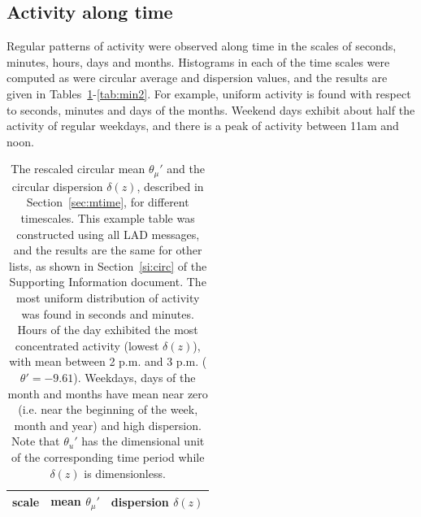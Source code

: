 \documentclass[%
aip,
jmp,%
amsmath,amssymb,
reprint,%
]{revtex4-1}
\begin{document}
\subsection{Activity along time}\label{constDisc}
Regular patterns of activity were observed along time
in the scales of seconds, minutes, hours, days and months.
Histograms in each of the time scales were computed as were circular average and dispersion values, and the results are given in Tables~\ref{tab:circ}-\ref{tab:min2}. For example, uniform activity is found with respect to seconds, minutes and days of the months. Weekend days exhibit about half the activity of regular weekdays, and there is a peak of activity between 11am and noon.


\begin{table}
\caption{The rescaled circular mean $\theta_\mu'$ and the circular dispersion $\delta(z)$, described in Section~\ref{sec:mtime}, for different timescales. This example table was constructed using all LAD messages, and the results are the same for other lists, as shown in Section~\ref*{si:circ} of the Supporting Information document. The most uniform distribution of activity was found in seconds and minutes. 	Hours of the day exhibited the most concentrated activity (lowest $\delta(z)$), with mean between 2 p.m. and 3 p.m. ($\theta'=-9.61$). Weekdays, days of the month and months have mean near zero (i.e. near the beginning of the week, month and year) and high dispersion. Note that $\theta_u'$ has the dimensional unit of the corresponding time period while $\delta(z)$ is dimensionless.}
\begin{center}
\begin{tabular}{ |l|| c|c| }
\hline
scale & mean $\theta_\mu'$ & dispersion $\delta(z)$  \\ \hline

\end{tabular}
\end{center}
\label{tab:circ}
\end{table}

\begin{table}
\caption{Activity percentages along the hours of the day. Nearly identical distributions were observed on other social systems as shown in Section~\ref*{si:hours} of the Supporting Information document.
Highest activity was observed between noon and 6pm (with 1/3 of total day activity), followed by the time period between 6pm and midnight.
Around 2/3 of the activity takes place from noon to midnight
but the activity peak occurs between 11 a.m. and 12 p.m.
This table shows results for the activity in CPP.}
\footnotesize

\label{tab:hin}
\end{table}
\end{document}
